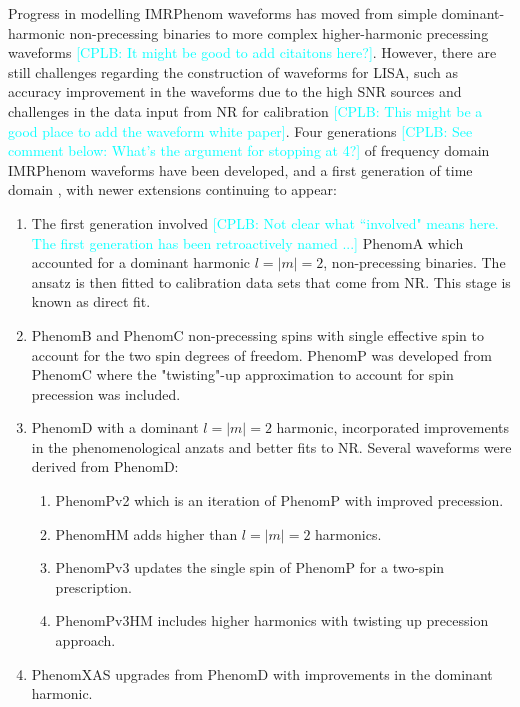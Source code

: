 \documentclass[a4paper,12pt]{article}
\newcommand{\cplb}[1]{\textcolor{cyan}{[CPLB: #1]}}
\begin{document}
Progress in modelling IMRPhenom waveforms has moved from simple dominant-harmonic non-precessing binaries to more complex higher-harmonic precessing waveforms \cplb{It might be good to add citaitons here?}.
However, there are still challenges regarding the construction of waveforms for LISA, such as accuracy improvement in the waveforms due to the high SNR sources and challenges in the data input from NR for calibration \cplb{This might be a good place to add the waveform white paper}. 
Four generations \cplb{See comment below: What's the argument for stopping at 4?} of frequency domain IMRPhenom waveforms have been developed, and a first generation of time domain \cite{afshordi2023waveform}, with newer extensions continuing to appear:
\begin{enumerate}
    \item The first generation involved \cplb{Not clear what ``involved" means here. The first generation has been retroactively named ...} PhenomA \cite{ajith2007phenomenological} which accounted for a dominant harmonic $l=|m|=2$, non-precessing binaries. The ansatz is then fitted to calibration data sets that come from NR. This stage is known as direct fit.
    \item PhenomB \cite{ajith2011addressing} and PhenomC \cite{santamaria2010matching} non-precessing spins with single effective spin to account for the two spin degrees of freedom. PhenomP \cite{hannam2014simple} was developed from PhenomC where the "twisting"-up approximation to account for spin precession was included.
    \item PhenomD \cite{khan2016frequency} with a dominant $l=|m|=2$ harmonic, incorporated improvements in the phenomenological anzats and better fits to NR. Several waveforms were derived from PhenomD:
	\begin{enumerate} 
        \item PhenomPv2 \cite{bohe2016phenompv2} which is an iteration of PhenomP with improved precession. 
        \item PhenomHM \cite{london2018first} adds higher than $l=|m|=2$ harmonics.
        \item PhenomPv3 \cite{khan2019phenomenological} updates the single spin of PhenomP for a two-spin prescription.
        \item PhenomPv3HM \cite{khan2020including} includes higher harmonics with twisting up precession approach.
        \end{enumerate}
    \item PhenomXAS \cite{Pratten_2020} upgrades from PhenomD with improvements in the dominant harmonic.

\end{enumerate}
\end{document}
